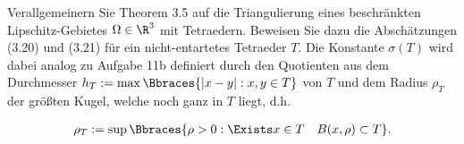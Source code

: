 
\begin{exercise}

Verallgemeinern Sie Theorem 3.5 auf die Triangulierung eines beschränkten Lipschitz-Gebietes $\Omega \in \R^3$ mit Tetraedern.
Beweisen Sie dazu die Abschätzungen (3.20) und (3.21) für ein nicht-entartetes Tetraeder $T$.
Die Konstante $\sigma(T)$ wird dabei analog zu Aufgabe 11b definiert durch den Quotienten aus dem Durchmesser $h_T := \max \Bbraces{|x - y|: x, y \in T}$ von $T$ und dem Radius $\rho_T$ der größten Kugel, welche noch ganz in $T$ liegt, d.h.

\begin{align}
  \rho_T
  :=
  \sup \Bbraces{\rho > 0: \Exists x \in T \quad B(x, \rho) \subset T}.
\end{align}

\end{exercise}


